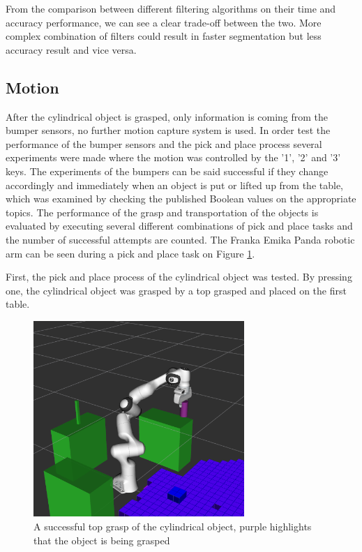 From the comparison between different filtering algorithms on their time and accuracy performance, we can see a clear trade-off between the two. More complex combination of filters could result in faster segmentation but less accuracy result and vice versa. 

\subsection*{Motion}
After the cylindrical object is grasped, only information is coming from the bumper sensors, no further motion capture system is used. In order test the performance of the bumper sensors and the pick and place process several experiments were made where the motion was controlled by the '1', '2' and '3' keys. The experiments of the bumpers can be said successful if they change accordingly and immediately when an object is put or lifted up from the table, which was examined by checking the published Boolean values on the appropriate topics. The performance of the grasp and transportation of the objects is evaluated by executing several different combinations of pick and place tasks and the number of successful attempts are counted. The Franka Emika Panda robotic arm can be seen during a pick and place task on Figure \ref{fig:cylindrical grasp}.


First, the pick and place process of the cylindrical object was tested. By pressing one, the cylindrical object was grasped by a top grasped and placed on the first table.    

\begin{figure}[h]
    \centering
    \includegraphics[width=8cm]{Images/cylindrical_grasp.png}
    \caption{A successful top grasp of the cylindrical object, purple highlights that the object is being grasped}
    \label{fig:cylindrical grasp}
\end{figure}

